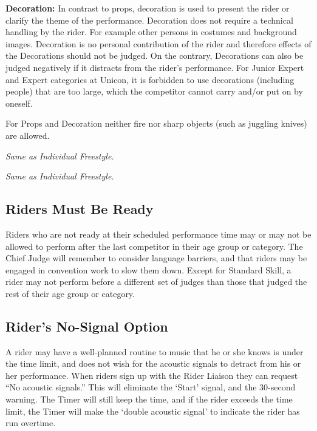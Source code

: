 \textbf{Decoration:} In contrast to props, decoration is used to present the rider or clarify the theme of the performance.
Decoration does not require a technical handling by the rider.
For example other persons in costumes and background images.
Decoration is no personal contribution of the rider and therefore effects of the Decorations should not be judged.
On the contrary, Decorations can also be judged negatively if it distracts from the rider’s performance.
For Junior Expert and Expert categories at Unicon, it is forbidden to use decorations (including people) that are too large, which the competitor cannot carry and/or put on by oneself. 

For Props and Decoration neither fire nor sharp objects (such as juggling knives) are allowed.

\textit{Same as Individual Freestyle.}

\textit{Same as Individual Freestyle.}

\subsection{Riders Must Be Ready}
Riders who are not ready at their scheduled performance time may or may not be allowed to perform after the last competitor in their age group or category.
The Chief Judge will remember to consider language barriers, and that riders may be engaged in convention work to slow them down.
Except for Standard Skill, a rider may not perform before a different set of judges than those that judged the rest of their age group or category.

\subsection{Rider's No-Signal Option}

A rider may have a well-planned routine to music that he or she knows is under the time limit, and does not wish for the acoustic signals to detract from his or her performance.
When riders sign up with the Rider Liaison they can request ``No acoustic signals.'' This will eliminate the `Start' signal, and the 30-second warning.
The Timer will still keep the time, and if the rider exceeds the time limit, the Timer will make the `double acoustic signal' to indicate the rider has run overtime.


